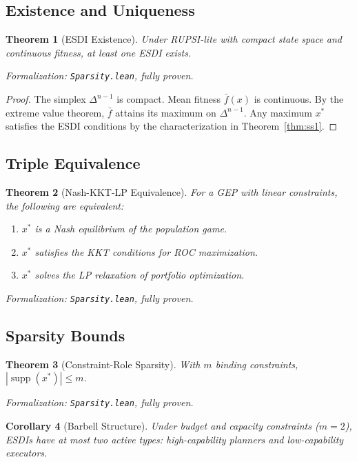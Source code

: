 \documentclass[12pt]{article}
\newtheorem{theorem}{Theorem}[section]
\newtheorem{corollary}[theorem]{Corollary}
\DeclareMathOperator{\supp}{supp}
\begin{document}
\subsection{Existence and Uniqueness}

\begin{theorem}[ESDI Existence]
\label{thm:esdi-existence}
Under RUPSI-lite with compact state space and continuous fitness, at least one ESDI exists.
\end{theorem}
\noindent\textit{Formalization: \texttt{Sparsity.lean}, fully proven.}

\begin{proof}
The simplex $\Delta^{n-1}$ is compact. Mean fitness $\bar{f}(x)$ is continuous. By the extreme value theorem, $\bar{f}$ attains its maximum on $\Delta^{n-1}$. Any maximum $x^*$ satisfies the ESDI conditions by the characterization in Theorem~\ref{thm:ss1}.
\end{proof}

\subsection{Triple Equivalence}

\begin{theorem}[Nash-KKT-LP Equivalence]
\label{thm:triple-equivalence}
For a GEP with linear constraints, the following are equivalent:
\begin{enumerate}
    \item $x^*$ is a Nash equilibrium of the population game.
    \item $x^*$ satisfies the KKT conditions for ROC maximization.
    \item $x^*$ solves the LP relaxation of portfolio optimization.
\end{enumerate}
\end{theorem}
\noindent\textit{Formalization: \texttt{Sparsity.lean}, fully proven.}

\subsection{Sparsity Bounds}

\begin{theorem}[Constraint-Role Sparsity]
\label{thm:sparsity}
With $m$ binding constraints, $|\supp(x^*)| \leq m$.
\end{theorem}
\noindent\textit{Formalization: \texttt{Sparsity.lean}, fully proven.}

\begin{corollary}[Barbell Structure]
Under budget and capacity constraints ($m = 2$), ESDIs have at most two active types: high-capability planners and low-capability executors.
\end{corollary}
\end{document}
